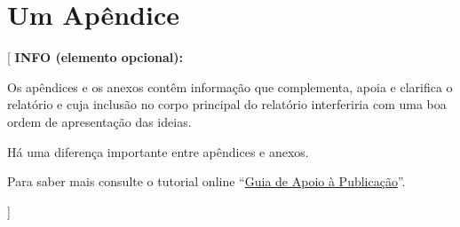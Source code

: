 \documentclass[11pt,a4paper]{report}
\newenvironment{infoopt}[1]{\vspace*{6mm}\color{blue}[ \textbf{INFO (elemento opcional):} \begin{em} #1}
                        {\vspace*{3mm}\end{em} ]}
\begin{document}

\appendix
\chapter{Um Apêndice}

\begin{infoopt}
Os apêndices e os anexos contêm informação que complementa, apoia e
clarifica o relatório e cuja inclusão no corpo principal do relatório
interferiria com uma boa ordem de apresentação das ideias.

Há uma diferença importante entre apêndices e anexos.

Para saber mais consulte o tutorial online 
``\href{https://docs.google.com/document/d/1TDC1behVq8x7fQL4CcPEEh_np5GXviJevQxnQ9gbiJs/edit}
{Guia de Apoio à Publicação}''.
\end{infoopt}

\end{document}
